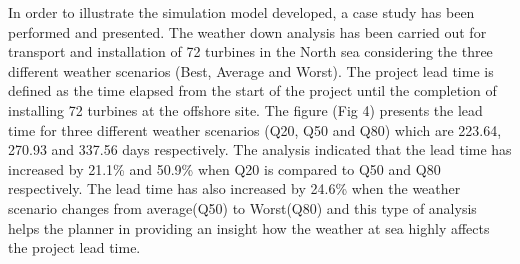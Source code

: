 In order to illustrate the simulation model developed, a case study has been performed and presented. The weather down analysis has been carried out for transport and installation of 72 turbines in the North sea considering the three different weather scenarios (Best, Average and Worst). The project lead time is defined as the time elapsed from the start of the project until the completion of installing 72 turbines at the offshore site. The figure (Fig 4) presents the lead time for three different weather scenarios (Q20, Q50 and Q80) which are 223.64, 270.93 and 337.56 days respectively. The analysis indicated that the lead time has increased by 21.1\% and 50.9\% when Q20 is compared to Q50 and Q80 respectively. The lead time has also increased by 24.6\% when the weather scenario changes from average(Q50) to Worst(Q80) and this type of analysis helps the planner in providing an insight how the weather at sea highly affects the project lead time. 

